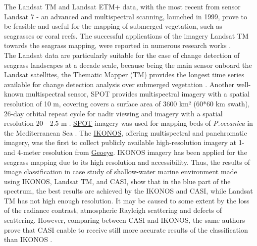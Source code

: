 \documentclass[10pt, a4paper]{article}
\begin{document}
The Landsat TM and Landsat ETM+ data, with the most recent from sensor Landsat 7 - an advanced
and multispectral scanning, launched in 1999, prove to be feasible and useful for the mapping of
submerged vegetation, such as seagrasses or coral reefs. The successful applications of the imagery
Landsat TM towards the seagrass mapping, were reported in numerous research works \cite{Palandro03,Gullstroom06,Wabnitz08,Bierwirth93,Ferguson97,Rasib97}\label{Palandro03}\label{Gullstroom06}\label{Wabnitz08}\label{Bierwirth93}\label{Ferguson97}\label{Rasib97}.\\ The Landsat data are particularly suitable for the
case of change detection of seagrass landscapes at a decade scale, because being the main sensor
onboard the Landsat satellites, the Thematic Mapper (TM) provides the longest time series
available for change detection analysis over submerged vegetation \cite{Palandro03}\label{Palandro03}.
Another well-known multispectral sensor, SPOT provides multispectral imagery with a spatial
resolution of 10 m, covering covers a surface area of 3600 km² (60*60 km swath), 26-day
orbital repeat cycle for nadir viewing and imagery with a spatial resolution 20 - 2.5 m
\cite{SPOT}\label{SPOT}. \href{http://www.spotimage.fr/}{SPOT} imagery was used for mapping beds of \textit{P.oceanica} in the
Mediterranean Sea \cite{Pasqualini05} \label{Pasqualini05}. 
The \href{http://www.satimagingcorp.com/gallery-ikonos.html}{IKONOS}, offering multispectral and panchromatic imagery, was the first to collect publicly
available high-resolution imagery at 1- and 4-meter resolution from \href{http://www.geoeye.com}{Geoeye}. IKONOS
imagery has been applied for the seagrass mapping due to its high resolution and accessibility. Thus,
the results of image classification in case study of shallow-water marine environment \cite{Mumby02}\label{Mumby02}
made using IKONOS, Landsat TM, and CASI, show that in the blue part of the
spectrum, the best results are achieved by the IKONOS and CASI, while Landsat TM has not high
enough resolution. 
It may be caused to some extent by the loss of the radiance contrast, atmospheric
Rayleigh scattering and defects of scattering. However, comparing between CASI and IKONOS, the
same authors prove that CASI enable to receive still more accurate results of the classification
than IKONOS \cite{Mumby02}\label{Mumby02}.
\end{document}
